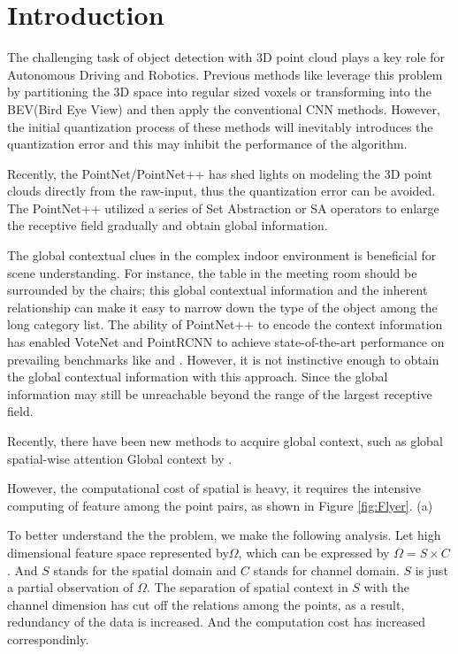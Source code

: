\documentclass[runningheads]{llncs}
\begin{document}
\section{Introduction}
The challenging task of object detection with 3D point cloud plays a key role for Autonomous Driving and Robotics. Previous methods  like \cite{voxelnet} leverage this problem by partitioning the 3D space into regular sized voxels or transforming into the BEV(Bird Eye View) \cite{pixor} and then apply the conventional CNN methods.
However, the initial quantization process of these methods will inevitably introduces the quantization error and this may inhibit the performance of the algorithm.

Recently, the PointNet/PointNet++ \cite{pointnet,pointnet++} has shed lights  on modeling the 3D point clouds directly from the raw-input, thus the quantization error can be avoided. The PointNet++ utilized a series  of Set Abstraction or SA operators to enlarge the receptive field gradually and obtain global information. 

 The global contextual clues in the complex indoor environment is beneficial for scene understanding. For instance,  the table in the meeting room should be surrounded by the chairs; this  global contextual information and the inherent relationship can make it easy  to narrow down the type of the object among the long category list. The ability of PointNet++ \cite{pointnet++} to encode the context information has enabled  VoteNet \cite{VoteNet} and PointRCNN \cite{PointRCNN} to achieve  state-of-the-art performance on prevailing benchmarks like  \cite{SUN_RGBD,SCannet} and \cite{Kitti}. However, it is not instinctive enough to obtain the global contextual information with this approach. Since the global information may still be unreachable beyond the range of the largest receptive field. %

Recently, there have been new methods to acquire global context, such as global spatial-wise  attention  Global context  by \cite{LG-PointNet++}.

However, the computational cost of spatial is heavy, it requires the intensive computing of feature among the point pairs, as shown in Figure \ref{fig:Flyer}. (a)

To better understand the  the problem,  we make the following analysis. Let high dimensional feature space represented by$\Omega$, which can be expressed by $\Omega= S \times C$. And $S$ stands for the spatial domain and $C$ stands for channel domain. $S$ is just a partial observation of $\Omega$. The separation of spatial context in $S$ with the channel dimension has cut off the relations among the points, as a result,  redundancy of the data is increased. And the computation cost has increased correspondinly.
\end{document}
